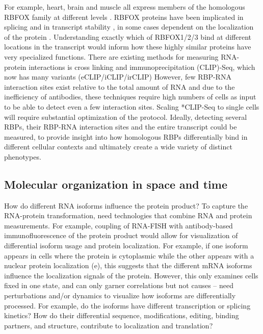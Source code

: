 For example, heart, brain and muscle all express members of the homologous RBFOX family at different levels \cite{Damianov2016-pa,Dredge2011-bk,Lovci2013-fr,Nutter2016-nu,Weyn-Vanhentenryck2014-vt}. RBFOX proteins have been implicated in splicing and in transcript stability \cite{Arya2014-po,Jangi2014-ww}, in some cases dependent on the localization of the protein \cite{Dredge2011-bk}. Understanding exactly which of RBFOX1/2/3 bind at different locations in the transcript would inform how these highly similar proteins have very specialized functions. There are existing methods for measuring RNA-protein interactions is cross linking and immunoprecipitation (CLIP)-Seq, which now has many variants (eCLIP/iCLIP/irCLIP) \cite{Haberman2017-at,Huppertz2014-jt,Van_Nostrand2016-qd,Zarnegar2016-zq} However, few RBP-RNA interaction sites exist relative to the total amount of RNA and due to the inefficiency of antibodies, these techniques require high numbers of cells as input to be able to detect even a few interaction sites. Scaling *CLIP-Seq to single cells will require substantial optimization of the protocol. Ideally, detecting several RBPs, their RBP-RNA interaction sites and the entire transcript could be measured, to provide insight into how homologous RBPs differentially bind in different cellular contexts and ultimately create a wide variety of distinct phenotypes. 

\subsection{Molecular organization in space and time}

How do different RNA isoforms influence the protein product? To capture the RNA-protein transformation, need technologies that combine RNA and protein measurements. For example, coupling of RNA-FISH with antibody-based immunofluorescence of the protein product would allow for visualization of differential isoform usage and protein localization. For example, if one isoform appears in cells where the protein is cytoplasmic while the other appears with a nuclear protein localization (e), this suggests that the different mRNA isoforms influence the localization signals of the protein. However, this only examines cells fixed in one state, and can only garner correlations but not causes -- need perturbations and/or dynamics to visualize how isoforms are differentially processed. For example, do the isoforms have different transcription or splicing kinetics? How do their differential sequence, modifications, editing, binding partners, and structure, contribute to localization and translation?

